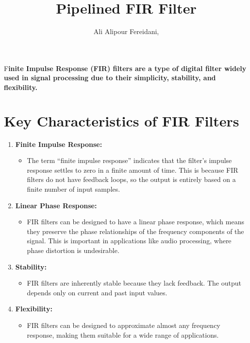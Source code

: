 \documentclass[paper=a4, fontsize=11pt, onecolumn]{scrartcl}	 %
\title{Pipelined FIR Filter} %
\author{Ali Alipour Fereidani, } %
\date{} %
\newcommand{\initial}[1]{ %
\lettrine[lines=3,lhang=0.3,nindent=0em]{
\color{DarkGoldenrod}
{\textsf{#1}}}{}}
\begin{document}
\maketitle %

\thispagestyle{fancy} %


\initial{F}\textbf{inite Impulse Response (FIR) filters are a type of digital filter widely used in signal processing due to their simplicity, stability, and flexibility.}


\section*{Key Characteristics of FIR Filters}

\begin{enumerate}
    \item \textbf{Finite Impulse Response:}
    \begin{itemize}
        \item The term ``finite impulse response'' indicates that the filter's impulse response settles to zero in a finite amount of time. This is because FIR filters do not have feedback loops, so the output is entirely based on a finite number of input samples.
    \end{itemize}

    \item \textbf{Linear Phase Response:}
    \begin{itemize}
        \item FIR filters can be designed to have a linear phase response, which means they preserve the phase relationships of the frequency components of the signal. This is important in applications like audio processing, where phase distortion is undesirable.
    \end{itemize}

    \item \textbf{Stability:}
    \begin{itemize}
        \item FIR filters are inherently stable because they lack feedback. The output depends only on current and past input values.
    \end{itemize}

    \item \textbf{Flexibility:}
    \begin{itemize}
        \item FIR filters can be designed to approximate almost any frequency response, making them suitable for a wide range of applications.
    \end{itemize}
\end{enumerate}
\end{document}
